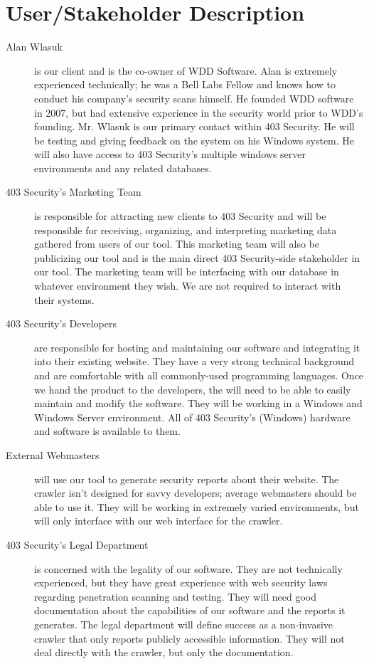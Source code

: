 \section{User/Stakeholder Description}
\begin{description}

\item[Alan Wlasuk] is our client and is the co-owner of WDD Software.  Alan is extremely experienced technically; he was a Bell Labs Fellow and knows how to conduct his company’s security scans himself. He founded WDD software in 2007, but had extensive experience in the security world prior to WDD’s founding.  Mr. Wlasuk is our primary contact within 403 Security.  He will be testing and giving feedback on the system on his Windows system.  He will also have access to 403 Security’s multiple windows server environments and any related databases.

\item[403 Security’s Marketing Team] is responsible for attracting new clients to 403 Security and will be responsible for receiving, organizing, and interpreting marketing data gathered from users of our tool. This marketing team will also be publicizing our tool and is the main direct 403 Security-side stakeholder in our tool. The marketing team will be interfacing with our database in whatever environment they wish.  We are not required to interact with their systems.  

\item[403 Security’s Developers] are responsible for hosting and maintaining our software and integrating it into their existing website. They have a very strong technical background and are comfortable with all commonly-used programming languages. Once we hand the product to the developers, the will need to be able to easily maintain and modify the software.  They will be working in a Windows and Windows Server environment.  All of 403 Security’s (Windows) hardware and software is available to them.

\item[External Webmasters] will use our tool to generate security reports about their website.  The crawler isn’t designed for savvy developers; average webmasters should be able to use it. They will be working in extremely varied environments, but will only interface with our web interface for the crawler.

\item[403 Security’s Legal Department] is concerned with the legality of our software. They are not technically experienced, but they have great experience with web security laws regarding penetration scanning and testing. They will need good documentation about the capabilities of our software and the reports it generates. The legal department will define success as a non-invasive crawler that only reports publicly accessible information.  They will not deal directly with the crawler, but only the documentation.


\end{description}
